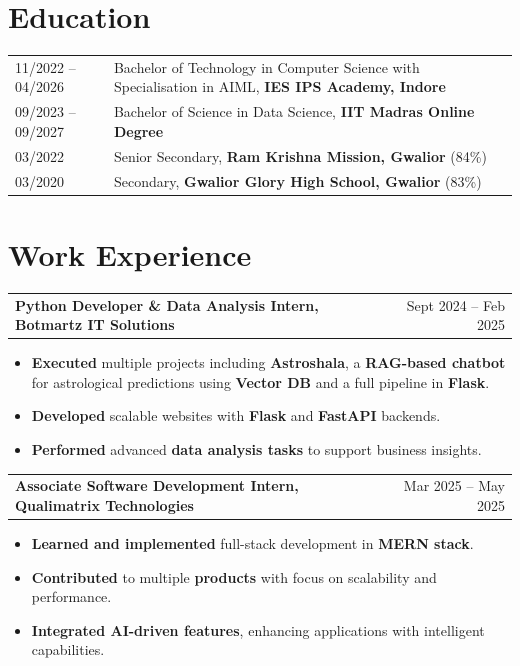 \documentclass[a4paper,12pt]{article}
\makeatletter
\newenvironment{joblong}[2]
    {
    \begin{tabularx}{\linewidth}{@{}l X r@{}}
    \textbf{#1} & \hfill &  #2 \\[3.75pt]
    \end{tabularx}
    \begin{minipage}[t]{\linewidth}
    \begin{itemize}[nosep,after=\strut, leftmargin=1em, itemsep=3pt,label=--]
    }
    {
    \end{itemize}
    \end{minipage}    
    }
\makeatother
\begin{document}
\section{Education}
\begin{tabularx}{\linewidth}{@{}l X@{}}	
11/2022 – 04/2026 & Bachelor of Technology in Computer Science with Specialisation in AIML, \textbf{IES IPS Academy, Indore} \\

09/2023 – 09/2027 & Bachelor of Science in Data Science, \textbf{IIT Madras Online Degree} \\

03/2022 & Senior Secondary, \textbf{Ram Krishna Mission, Gwalior} \hspace*{\fill} \small(84\%) \\

03/2020 & Secondary, \textbf{Gwalior Glory High School, Gwalior} \hspace*{\fill} \small(83\%) \\
\end{tabularx}


\section{Work Experience}

\begin{joblong}{\textbf{Python Developer \& Data Analysis Intern}, Botmartz IT Solutions}{Sept 2024 -- Feb 2025}
\item \textbf{Executed} multiple projects including \textbf{Astroshala}, a \textbf{RAG-based chatbot} for astrological predictions using \textbf{Vector DB} and a full pipeline in \textbf{Flask}.
\item \textbf{Developed} scalable websites with \textbf{Flask} and \textbf{FastAPI} backends.  
\item \textbf{Performed} advanced \textbf{data analysis tasks} to support business insights.  
\end{joblong}

\begin{joblong}{\textbf{Associate Software Development Intern}, Qualimatrix Technologies}{Mar 2025 -- May 2025}
\item \textbf{Learned and implemented} full-stack development in \textbf{MERN stack}.  
\item \textbf{Contributed} to multiple \textbf{products} with focus on scalability and performance.  
\item \textbf{Integrated AI-driven features}, enhancing applications with intelligent capabilities.  
\end{joblong}
\end{document}

